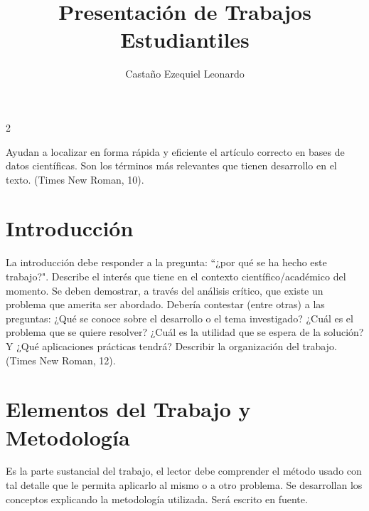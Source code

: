 


\author{Castaño Ezequiel Leonardo}
\title{Presentación de Trabajos Estudiantiles}


\titulo

\begin{multicols}{2}



{\footnotesize
Ayudan a localizar en forma rápida y eficiente el artículo correcto en bases de datos científicas. Son los términos más relevantes que tienen desarrollo en el texto. (Times New Roman, 10).
\par}

\section{Introducción}

La introducción debe responder a la pregunta: “¿por qué se ha hecho este trabajo?". Describe el interés que tiene en el contexto científico/académico del momento. Se deben demostrar, a través del análisis crítico, que existe un problema que amerita ser abordado. Debería contestar (entre otras) a las preguntas: ¿Qué se conoce sobre el desarrollo o el tema investigado? ¿Cuál es el problema que se quiere resolver? ¿Cuál es la utilidad que se espera de la solución? Y ¿Qué aplicaciones prácticas tendrá? Describir la organización del trabajo. (Times New Roman, 12).

\section{Elementos del Trabajo y Metodología}

Es la parte sustancial del trabajo, el lector debe comprender el método usado con tal detalle que le permita aplicarlo al mismo o a otro problema. Se desarrollan los conceptos explicando la metodología utilizada. Será escrito en fuente.


\end{multicols}
